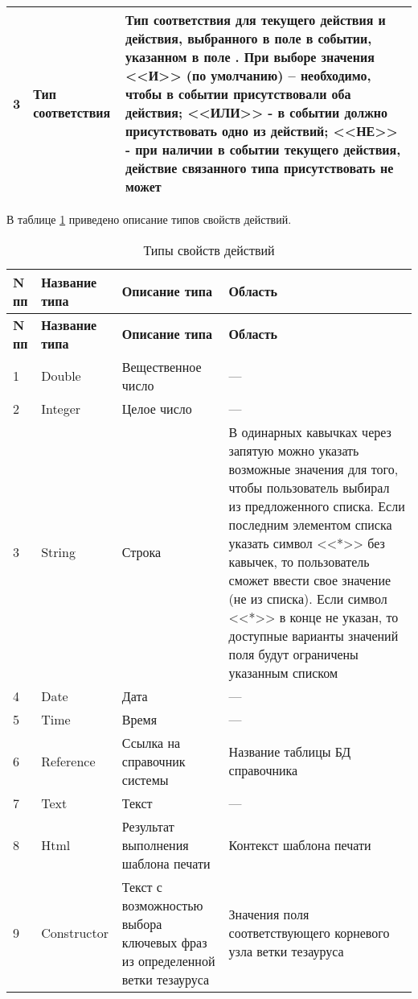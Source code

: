 {\begin{longtable}{|p{0.55cm}|p{4cm}|p{12cm}|}
3	& Тип соответствия	& Тип соответствия для текущего действия и действия, выбранного в поле \dm{Связанный тип действия} в событии, указанном в поле \dm{Тип события}. При выборе значения <<И>> (по умолчанию) – необходимо, чтобы в событии присутствовали оба действия; <<ИЛИ>> - в событии должно присутствовать одно из действий; <<НЕ>> - при наличии в событии текущего действия, действие связанного типа присутствовать не может \\ \hline
\end{longtable}
}

В таблице \ref{tbl_spr_tpact_prop} приведено описание типов свойств действий.

{\small
\begin{longtable}{|p{0.55cm}|p{3.5cm}|p{6.1cm}|p{6.1cm}|}
\caption{Типы свойств действий \label{tbl_spr_tpact_prop}} \\
\hline \rule{0pt}{15pt} \centering \textbf{N пп} & \centering \textbf{Название типа} & \centering \textbf{Описание типа} & \hfil \textbf{Область} \\ \hline
\endfirsthead
\hline \rule{0pt}{15pt} \centering \textbf{N пп} & \centering \textbf{Название типа} & \centering \textbf{Описание типа} & \hfil \textbf{Область} \\ \hline
\endhead
1 &	Double	& Вещественное число	& ---  \\ \hline
2 &	Integer	& Целое число	& --- \\ \hline
3 &	String	& Строка	& В одинарных кавычках через запятую можно указать возможные значения для того, чтобы пользователь выбирал из предложенного списка. Если последним элементом списка указать символ <<*>> без кавычек, то пользователь сможет ввести свое значение (не из списка). Если символ <<*>> в конце не указан, то доступные варианты значений поля будут ограничены указанным списком \\ \hline
4 &	Date &	Дата	& --- \\ \hline
5	& Time &	Время &	--- \\ \hline
6	& Reference	& Ссылка на справочник системы	& Название таблицы БД справочника \\ \hline
7	& Text	& Текст	& --- \\ \hline
8	& Html	& Результат выполнения шаблона печати &	Контекст шаблона печати \\ \hline
9	& Constructor &	Текст с возможностью выбора ключевых фраз из определенной ветки тезауруса	& Значения поля \dm{Код} соответствующего корневого узла ветки тезауруса \\ \hline

\end{longtable}}
